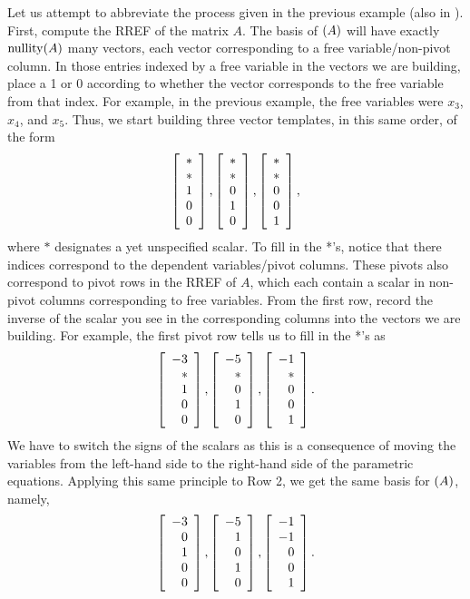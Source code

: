 Let us attempt to abbreviate the process given in the previous example (also in ). First, compute the RREF of the matrix $A$. The basis of $\null(A)$ will have exactly $\operatorname*{nullity}(A)$ many vectors, each vector corresponding to a free variable/non-pivot column. In those entries indexed by a free variable in the vectors we are building, place a 1 or 0 according to whether the vector corresponds to the free variable from that index. For example, in the previous example, the free variables were $x_3$, $x_4$, and $x_5$. Thus, we start building three vector templates, in this same order, of the form
\[\left[\begin{array}{r} * \\ * \\ 1 \\ 0 \\ 0 \end{array}\right], \left[\begin{array}{r} * \\ * \\ 0 \\ 1 \\ 0 \end{array}\right], \left[\begin{array}{r} * \\ * \\0\\0\\1 \end{array}\right],\] where $*$ designates a yet unspecified scalar. To fill in the *'s, notice that there indices correspond to the dependent variables/pivot columns. These pivots also correspond to pivot rows in the RREF of $A$, which each contain a scalar in non-pivot columns corresponding to free variables. From the first row, record the inverse of the scalar you see in the corresponding columns into the vectors we are building. For example, the first pivot row tells us to fill in the *'s as
\[\left[\begin{array}{r} -3 \\ * \\ 1 \\ 0 \\ 0 \end{array}\right], \left[\begin{array}{r} -5 \\ * \\ 0 \\ 1 \\ 0 \end{array}\right], \left[\begin{array}{r} -1 \\ * \\0\\0\\1 \end{array}\right].\] We have to switch the signs of the scalars as this is a consequence of moving the variables from the left-hand side to the right-hand side of the parametric equations. Applying this same principle to Row 2, we get the same basis for $\null(A)$, namely,
\[\left[\begin{array}{r} -3 \\ 0 \\ 1 \\ 0 \\ 0 \end{array}\right], \left[\begin{array}{r} -5 \\ 1 \\ 0 \\ 1 \\ 0 \end{array}\right], \left[\begin{array}{r} -1 \\ -1 \\0\\0\\1 \end{array}\right].\]\vs

